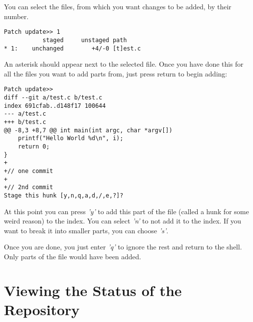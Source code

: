 You can select the files, from which you want changes to be added, by 
their number.

\begin{lstlisting}[label=git-add-i, caption='Adding parts of files to a git repository']
Patch update>> 1
           staged     unstaged path
* 1:    unchanged        +4/-0 [t]est.c
\end{lstlisting}

An asterisk should appear next to the selected file. Once you have
done this for all the files you want to add parts from, just press 
return to begin adding:

\begin{lstlisting}[label=git-add-i, caption='Adding parts of files to a git repository']
Patch update>> 
diff --git a/test.c b/test.c
index 691cfab..d148f17 100644
--- a/test.c
+++ b/test.c
@@ -8,3 +8,7 @@ int main(int argc, char *argv[])
 	printf("Hello World %d\n", i);
	return 0;
}
+
+// one commit
+
+// 2nd commit
Stage this hunk [y,n,q,a,d,/,e,?]? 
\end{lstlisting}

At this point you can press \emph{'y'} to add this part of the file (called
a hunk for some weird reason) to the index. You can select \emph{'n'} to 
not add it to the index. If you want to break it into smaller parts,
you can choose \emph{'s'}.

Once you are done, you just enter \emph{'q'} to ignore the rest and return
to the shell. Only parts of the file would have been added.

\section{Viewing the Status of the Repository}
